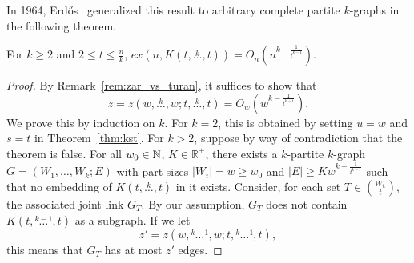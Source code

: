 In 1964, Erdős~\cite{Erods1964} generalized this result to arbitrary complete partite $k$-graphs in the following theorem.

\begin{theorem}\label{thm:erdos64}
    For $k \geq 2$ and $2 \leq t \leq \frac{n}{k}$,
    $ex(n, K(t, \overset{k}{\dots}, t)) = O_n\left(n^{k - \frac{1}{t^{k-1}}}\right)$.
    \begin{proof}
        By Remark~\ref{rem:zar_vs_turan}, it suffices to show that
        \[
            z = z(w, \overset{k}{\dots}, w; t, \overset{k}{\dots}, t) = O_w\left(w^{k - \frac{1}{t^{k-1}}}\right).
        \]
        We prove this by induction on $k$.
        For $k=2$, this is obtained by setting $u = w$ and $s = t$ in Theorem~\ref{thm:kst}.
        For $k > 2$, suppose by way of contradiction that the theorem is false.
        For all ${w_0 \in \mathbb{N}}$, ${K \in \mathbb{R}^+}$, there exists a $k$-partite $k$-graph $G = (W_1, \dots, W_k; E)$ with part sizes
        $|W_i| = w \geq w_0$ and ${|E| \geq K w^{k - \frac{1}{t^{k-1}}}}$ such that no embedding of $K(t, \overset{k}{\dots}, t)$ in it exists.
        Consider, for each set $T \in \binom{W_k}{t}$, the associated joint link $G_T$.
        By our assumption, $G_T$ does not contain $K(t, \overset{k-1}{\dots}, t)$ as a subgraph.
        If we let
        \[
            z' = z(w, \overset{k-1}{\dots}, w; t, \overset{k-1}{\dots}, t),
        \]
        this means that $G_T$ has at most $z'$ edges.


\end{proof}
\end{theorem}

